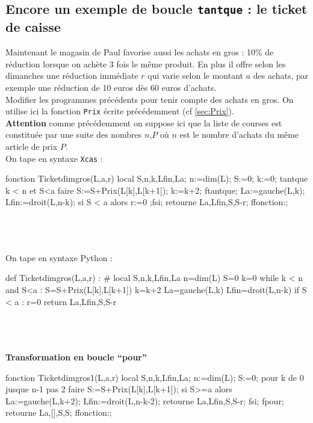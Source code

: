 \documentclass[12pt,a4paper]{book}
\begin{document}
\begin{giacjshere}
\section{Encore un exemple de boucle {\tt tantque} : le ticket de caisse}
Maintenant le magasin de Paul favorise aussi les achats en gros :
 10\% de r\'eduction lorsque on ach\`ete 3 fois le m\^eme produit.
En plus il offre selon les dimanches une r\'eduction imm\'ediate $r$ qui varie 
selon le montant $a$ des achats, par exemple une r\'eduction de 10 euros d\`es 
60 euros d'achats.\\
Modifier les programmes pr\'ec\'edents pour tenir compte des achats en 
gros. On utilise ici la fonction {\tt Prix} \'ecrite pr\'ec\'edemment 
(cf \ref{sec:Prix}).\\
{\bf Attention} comme pr\'ec\'edemment on suppose ici que la liste de courses 
est constitu\'ee par une suite des nombres $n$,$P$ o\`u $n$ est le nombre 
d'achats du m\^eme article de prix $P$.\\
On tape en syntaxe {\tt Xcas} :
\begin{giaconload}
fonction Ticketdimgros(L,a,r) 
 local S,n,k,Lfin,La; 
 n:=dim(L);
 S:=0;
 k:=0;
 tantque k < n et S<a faire 
   S:=S+Prix(L[k],L[k+1]);
   k:=k+2;
 ftantque;
 La:=gauche(L,k);
 Lfin:=droit(L,n-k);
 si S < a alors r:=0 ;fsi;
 retourne La,Lfin,S,S-r;
ffonction:;
\end{giaconload}
\\
\\
\\
On tape en syntaxe Python :
\begin{giacprog}
def Ticketdimgros(L,a,r) :
    # local S,n,k,Lfin,La 
    n=dim(L)
    S=0
    k=0
    while k < n and S<a :
        S=S+Prix(L[k],L[k+1])
        k=k+2
    La=gauche(L,k)
    Lfin=droit(L,n-k)
    if S < a :
        r=0 
    return La,Lfin,S,S-r
\end{giacprog}
\\
\\
\\
{\bf Transformation en boucle ``pour''}
\begin{giaconload}
fonction Ticketdimgros1(L,a,r) 
 local S,n,k,Lfin,La; 
 n:=dim(L);
 S:=0;
 pour k de 0 jusque n-1 pas 2 faire
   S:=S+Prix(L[k],L[k+1]);
   si S>=a alors 
     La:=gauche(L,k+2);
     Lfin:=droit(L,n-k-2);
     retourne La,Lfin,S,S-r;
   fsi;
 fpour;
 retourne La,[],S,S;
ffonction:;
\end{giaconload}
\\
\\


\end{giacjshere}
\end{document}
